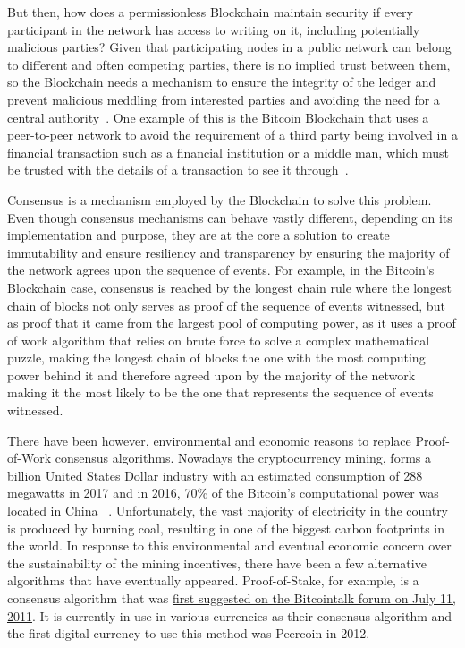 But then, how does a permissionless Blockchain maintain security if every
participant in the network has access to writing on it, including potentially
malicious parties? Given that participating nodes in a public network can
belong to different and often competing parties, there is no implied trust
between them, so the Blockchain needs a mechanism to ensure the integrity of
the ledger and prevent malicious meddling from interested parties and avoiding
the need for a central authority~\cite{Barclay2017}.  One example of this is
the Bitcoin Blockchain that uses a peer-to-peer network to avoid the
requirement of a third party being involved in a financial transaction such as
a financial institution or a middle man, which must be trusted with the details
of a transaction to see it through~\cite{Nakamoto2008}.

Consensus is a mechanism employed by the Blockchain to solve this problem.
Even though consensus mechanisms can behave vastly different, depending on its
implementation and purpose, they are at the core a solution to create
immutability and ensure resiliency and transparency by ensuring the majority of
the network agrees upon the sequence of events.  For example, in the Bitcoin's
Blockchain case, consensus is reached by the longest chain rule where the
longest chain of blocks not only serves as proof of the sequence of events
witnessed, but as proof that it came from the largest pool of computing power,
as it uses a proof of work algorithm that relies on brute force to solve a
complex mathematical puzzle, making the longest chain of blocks the one with
the most computing power behind it and therefore agreed upon by the majority of
the network~\cite{Baars2016,Wood2017} making it the most likely to be the one
that represents the sequence of events witnessed.

There have been however, environmental and economic reasons to replace
Proof-of-Work consensus algorithms. Nowadays the cryptocurrency mining, forms a
billion United States Dollar industry with an estimated consumption of 288
megawatts in 2017 and in 2016, 70\% of the Bitcoin's computational power was
located in China ~\cite{BitcoinMining2017}.  Unfortunately, the vast majority
of electricity in the country is produced by burning coal, resulting in one of
the biggest carbon footprints in the world. In response to this environmental
and eventual economic concern over the sustainability of the mining incentives,
there have been a few alternative algorithms that have eventually appeared.
Proof-of-Stake, for example, is a consensus algorithm that was
\href{https://bitcointalk.org/index.php?topic=27787.0}{first suggested on the
Bitcointalk forum on July 11, 2011}. It is currently in use in various
currencies as their consensus algorithm and the first digital currency to use
this method was Peercoin in 2012. 

